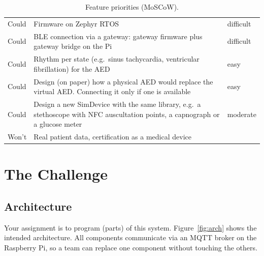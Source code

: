 \documentclass[11pt,a4paper]{article}
\begin{document}
\begin{table}[h]
\begin{tabularx}{\linewidth}{@{}l X l@{}}
Could  & Firmware on Zephyr RTOS & difficult \\
Could  & BLE connection via a gateway: gateway firmware plus gateway bridge on the Pi & difficult \\
Could  & Rhythm per state (e.g.\ sinus tachycardia, ventricular fibrillation) for the AED & easy \\
Could  & Design (on paper) how a physical AED would replace the virtual AED. Connecting it only if one is available & easy \\
Could  & Design a new SimDevice with the same library, e.g.\ a stethoscope with NFC auscultation points, a capnograph or a glucose meter & moderate \\
Won't  & Real patient data, certification as a medical device & \\
\bottomrule
\end{tabularx}
\caption{Feature priorities (MoSCoW).}
\label{tab:moscow}
\end{table}

\section{The Challenge}
\subsection{Architecture}
Your assignment is to program (parts) of this system. Figure~\ref{fig:arch}
shows the intended architecture. All components communicate via an MQTT broker
on the Raspberry Pi, so a team can replace one component without touching the
others.
\end{document}
